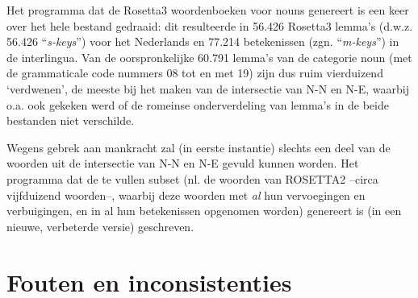 Het programma dat de Rosetta3 woordenboeken voor nouns genereert is een keer
over het hele bestand gedraaid: dit resulteerde in 56.426 Rosetta3 lemma's 
(d.w.z. 56.426 ``{\em s-keys}'') voor het Nederlands en 77.214 betekenissen 
(zgn. ``{\em m-keys}'') in de interlingua. Van de oorspronkelijke 60.791 lemma's
van de categorie noun (met de grammaticale code nummers 08 tot en met 19)
zijn dus ruim vierduizend `verdwenen', de meeste bij het maken van de 
intersectie van
N-N en N-E, waarbij o.a. ook gekeken werd of de romeinse onderverdeling van 
lemma's in de beide bestanden niet verschilde.

Wegens gebrek aan mankracht zal (in eerste instantie) slechts een deel van de
woorden uit de intersectie van N-N en N-E gevuld kunnen worden.
Het programma dat de te vullen subset (nl. de woorden van ROSETTA2 
--circa vijfduizend woorden--, waarbij deze woorden met {\em al} 
hun vervoegingen en verbuigingen, en in al hun betekenissen opgenomen worden)
genereert is (in een nieuwe, verbeterde versie) geschreven.

\section{Fouten en inconsistenties}

